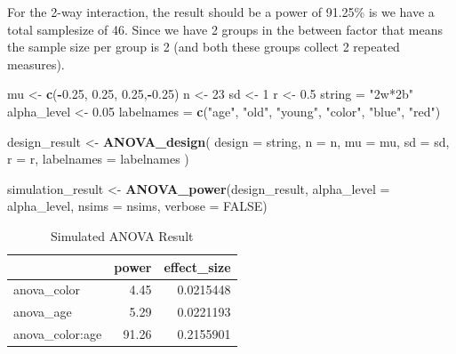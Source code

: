 \documentclass[]{book}
\newenvironment{Shaded}{\begin{snugshade}}{\end{snugshade}}
\newcommand{\DataTypeTok}[1]{\textcolor[rgb]{0.13,0.29,0.53}{#1}}
\newcommand{\DecValTok}[1]{\textcolor[rgb]{0.00,0.00,0.81}{#1}}
\newcommand{\FloatTok}[1]{\textcolor[rgb]{0.00,0.00,0.81}{#1}}
\newcommand{\KeywordTok}[1]{\textcolor[rgb]{0.13,0.29,0.53}{\textbf{#1}}}
\newcommand{\NormalTok}[1]{#1}
\newcommand{\OperatorTok}[1]{\textcolor[rgb]{0.81,0.36,0.00}{\textbf{#1}}}
\newcommand{\OtherTok}[1]{\textcolor[rgb]{0.56,0.35,0.01}{#1}}
\newcommand{\StringTok}[1]{\textcolor[rgb]{0.31,0.60,0.02}{#1}}
\begin{document}
For the 2-way interaction, the result should be a power of 91.25\% is we have a total samplesize of 46. Since we have 2 groups in the between factor that means the sample size per group is 2 (and both these groups collect 2 repeated measures).

\begin{Shaded}
\begin{Highlighting}[]
\NormalTok{mu <-}\StringTok{ }\KeywordTok{c}\NormalTok{(}\OperatorTok{-}\FloatTok{0.25}\NormalTok{, }\FloatTok{0.25}\NormalTok{, }\FloatTok{0.25}\NormalTok{,}\OperatorTok{-}\FloatTok{0.25}\NormalTok{)}
\NormalTok{n <-}\StringTok{ }\DecValTok{23}
\NormalTok{sd <-}\StringTok{ }\DecValTok{1}
\NormalTok{r <-}\StringTok{ }\FloatTok{0.5}
\NormalTok{string =}\StringTok{ "2w*2b"}
\NormalTok{alpha_level <-}\StringTok{ }\FloatTok{0.05}
\NormalTok{labelnames =}\StringTok{ }\KeywordTok{c}\NormalTok{(}\StringTok{"age"}\NormalTok{, }\StringTok{"old"}\NormalTok{, }\StringTok{"young"}\NormalTok{, }\StringTok{"color"}\NormalTok{, }\StringTok{"blue"}\NormalTok{, }\StringTok{"red"}\NormalTok{)}

\NormalTok{design_result <-}\StringTok{ }\KeywordTok{ANOVA_design}\NormalTok{(}
\DataTypeTok{design =}\NormalTok{ string,}
\DataTypeTok{n =}\NormalTok{ n,}
\DataTypeTok{mu =}\NormalTok{ mu,}
\DataTypeTok{sd =}\NormalTok{ sd,}
\DataTypeTok{r =}\NormalTok{ r,}
\DataTypeTok{labelnames =}\NormalTok{ labelnames}
\NormalTok{)}
\end{Highlighting}
\end{Shaded}

\begin{Shaded}
\begin{Highlighting}[]
\NormalTok{simulation_result <-}\StringTok{ }\KeywordTok{ANOVA_power}\NormalTok{(design_result, }
                                 \DataTypeTok{alpha_level =}\NormalTok{ alpha_level, }
                                 \DataTypeTok{nsims =}\NormalTok{ nsims,}
                                 \DataTypeTok{verbose =} \OtherTok{FALSE}\NormalTok{)}
\end{Highlighting}
\end{Shaded}

\begin{table}[!h]

\caption{\label{tab:unnamed-chunk-172}Simulated ANOVA Result}
\centering
\begin{tabular}{l|r|r}
\hline
  & power & effect\_size\\
\hline
anova\_color & 4.45 & 0.0215448\\
\hline
anova\_age & 5.29 & 0.0221193\\
\hline
anova\_color:age & 91.26 & 0.2155901\\
\hline
\end{tabular}
\end{table}
\end{document}
